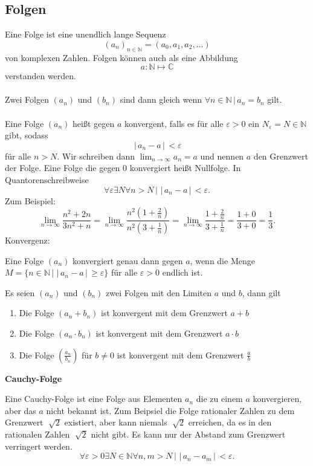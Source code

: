 \documentclass[a4paper,12pt]{article}
\numberwithin{equation}{section}
\begin{document}
\subsection{Folgen}
Eine Folge ist eine unendlich lange Sequenz
\[ 
        \left(a_n\right)_{n  \in \mathbb{N}}=\left(a_0,a_1,a_2,\hdots\right)
\] 
von komplexen Zahlen. Folgen können auch als eine Abbildung 
\[
        a:\mathbb{N}\mapsto\mathbb{C}
\]
verstanden werden.\\\\
Zwei Folgen $\left(a_n\right)$ und $\left(b_n\right)$ sind dann gleich wenn $\forall n  \in \mathbb{N}\,|\, a_n=b_n$ gilt.\\\\
Eine Folge $\left(a_n\right)$ heißt gegen $a$ konvergent, falls es für alle $\varepsilon>0$ ein $N_{\varepsilon} =N  \in \mathbb{N}$ gibt, sodass
\[ 
        \,|\, a_n-a\,|\, <\varepsilon
\] 
für alle $n>N$. Wir schreiben dann $\lim_{n\rightarrow \infty}a_n=a$ und nennen $a$ den Grenzwert der Folge. Eine Folge die gegen $0$ konvergiert heißt Nullfolge. In Quantorenschreibweise
\[ 
        \forall \varepsilon \exists N \forall n>N\,|\, \,|\, a_n-a\,|\, <\varepsilon
.\]
Zum Beispiel:
\[ 
        \lim_{n\rightarrow \infty}\dfrac{n^2+2n}{3n^2+n}=\lim_{n\rightarrow \infty}\dfrac{n^2\left(1+\tfrac{2}{n}\right)}{n^2\left(3+\tfrac{1}{n}\right)}=\lim_{n\rightarrow \infty}\dfrac{1+\tfrac{2}{n}}{3+\tfrac{1}{n}}=\dfrac{1+0}{3+0}=\dfrac{1}{3}
.\] 
Konvergenz:
\begin{center}
        Eine Folge $\left(a_n\right)$ konvergiert genau dann gegen $a$, wenn die Menge\\ $M=\{n  \in \mathbb{N}\,|\, \,|\, a_n-a\,|\, \geq \varepsilon \}$ für alle $\varepsilon >0$ endlich ist.
\end{center}
Es seien $\left(a_n\right)$ und $\left(b_n\right)$ zwei Folgen mit den Limiten $a$ und $b$, dann gilt
\begin{enumerate}[label=]
        \item Die Folge $\left(a_n+b_n\right)$ ist konvergent mit dem Grenzwert $a+b$ 
        \item Die Folge $\left(a_n\cdot b_n\right)$ ist konvergent mit dem Grenzwert $a\cdot b$ 
        \item Die Folge $\left(\tfrac{a_n}{b_n}\right)$ für $b\neq 0$ ist konvergent mit dem Grenzwert $\tfrac{a}{b}$ 
\end{enumerate}
\textbf{Cauchy-Folge}
\begin{center}
Eine Cauchy-Folge ist eine Folge aus Elementen $a_n$ die zu einem $a$ konvergieren, aber das $a$ nicht bekannt ist. Zum Beipsiel die Folge rationaler Zahlen zu dem Grenzwert $\sqrt[]{2}$ existiert, aber kann niemals $\sqrt[]{2}$ erreichen, da es in den rationalen Zahlen $\sqrt[]{2}$ nicht gibt. Es kann nur der Abstand zum Grenzwert verringert werden.
\[ 
        \forall \varepsilon >0\exists N \in \mathbb{N}\forall n,m>N\,|\, \,|\, a_n-a_m\,|\, <\varepsilon 
.\] 
\end{center}
\end{document}
